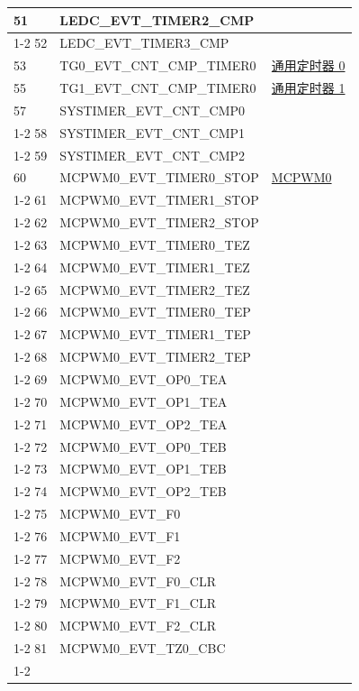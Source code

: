 \documentclass[main\_\_CN.tex]{subfiles}
\begin{document}
\begin{longtable}{ | l | l | l | }
51  & LEDC\_EVT\_TIMER2\_CMP    & \\ \cline{1-2}
52  & LEDC\_EVT\_TIMER3\_CMP    & \\ \hline
53  & TG0\_EVT\_CNT\_CMP\_TIMER0    & \hyperref[mod:timg]{通用定时器 0}   \\ \hline
55  & TG1\_EVT\_CNT\_CMP\_TIMER0    & \hyperref[mod:timg]{通用定时器 1}   \\ \hline
57  & SYSTIMER\_EVT\_CNT\_CMP0  & \nameref{mod:systimer}     \\ \cline{1-2}
58  & SYSTIMER\_EVT\_CNT\_CMP1  & \\ \cline{1-2}
59  & SYSTIMER\_EVT\_CNT\_CMP2  & \\ \hline
60  & MCPWM0\_EVT\_TIMER0\_STOP  & \hyperref[mod:mcpwm]{MCPWM0}\\ \cline{1-2}
61  & MCPWM0\_EVT\_TIMER1\_STOP  & \\ \cline{1-2}
62  & MCPWM0\_EVT\_TIMER2\_STOP  & \\ \cline{1-2}
63  & MCPWM0\_EVT\_TIMER0\_TEZ   & \\ \cline{1-2}
64  & MCPWM0\_EVT\_TIMER1\_TEZ   & \\ \cline{1-2}
65  & MCPWM0\_EVT\_TIMER2\_TEZ   & \\ \cline{1-2}
66  & MCPWM0\_EVT\_TIMER0\_TEP   & \\ \cline{1-2}
67  & MCPWM0\_EVT\_TIMER1\_TEP   & \\ \cline{1-2}
68  & MCPWM0\_EVT\_TIMER2\_TEP   & \\ \cline{1-2}
69  & MCPWM0\_EVT\_OP0\_TEA & \\ \cline{1-2}
70  & MCPWM0\_EVT\_OP1\_TEA & \\ \cline{1-2}
71  & MCPWM0\_EVT\_OP2\_TEA & \\ \cline{1-2}
72  & MCPWM0\_EVT\_OP0\_TEB & \\ \cline{1-2}
73  & MCPWM0\_EVT\_OP1\_TEB & \\ \cline{1-2}
74  & MCPWM0\_EVT\_OP2\_TEB & \\ \cline{1-2}
75  & MCPWM0\_EVT\_F0     & \\ \cline{1-2}
76  & MCPWM0\_EVT\_F1     & \\ \cline{1-2}
77  & MCPWM0\_EVT\_F2     & \\ \cline{1-2}
78  & MCPWM0\_EVT\_F0\_CLR  & \\ \cline{1-2}
79  & MCPWM0\_EVT\_F1\_CLR  & \\ \cline{1-2}
80  & MCPWM0\_EVT\_F2\_CLR  & \\ \cline{1-2}
81  & MCPWM0\_EVT\_TZ0\_CBC & \\ \cline{1-2}

\end{longtable}
\end{document}
